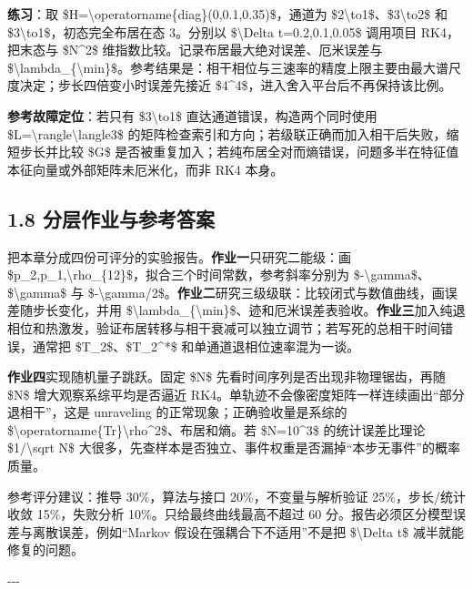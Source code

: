 \documentclass[UTF8,openany,11pt,fontset=fandol]{ctexbook}
\begin{document}
\textbf{练习}：取
\$H=\textbackslash operatorname\{diag\}(0,0.1,0.35)\$，通道为
\$2\textbackslash to1\$、\$3\textbackslash to2\$ 和
\$3\textbackslash to1\$，初态完全布居在态 3。分别以
\$\textbackslash Delta t=0.2,0.1,0.05\$ 调用项目 RK4，把末态与
\$N\^{}2\$ 维指数比较。记录布居最大绝对误差、厄米误差与
\$\textbackslash lambda\_\{\textbackslash min\}\$。参考结果是：相干相位与三速率的精度上限主要由最大谱尺度决定；步长四倍变小时误差先接近
\$4\^{}4\$，进入舍入平台后不再保持该比例。

\textbf{参考故障定位}：若只有 \$3\textbackslash to1\$
直达通道错误，构造两个同时使用
\$L=\textbackslash rangle\textbackslash langle3\textbar\$
的矩阵检查索引和方向；若级联正确而加入相干后失败，缩短步长并比较 \$G\$
是否被重复加入；若纯布居全对而熵错误，问题多半在特征值本征向量或外部矩阵未厄米化，而非
RK4 本身。

\subsection{\texorpdfstring{\textbf{1.8
分层作业与参考答案}}{1.8 分层作业与参考答案}}\label{ux5206ux5c42ux4f5cux4e1aux4e0eux53c2ux8003ux7b54ux6848}

把本章分成四份可评分的实验报告。\textbf{作业一}只研究二能级：画
\$p\_2,p\_1,\textbar\textbackslash rho\_\{12\}\textbar\$，拟合三个时间常数，参考斜率分别为
\$-\textbackslash gamma\$、\$\textbackslash gamma\$ 与
\$-\textbackslash gamma/2\$。\textbf{作业二}研究三级级联：比较闭式与数值曲线，画误差随步长变化，并用
\$\textbackslash lambda\_\{\textbackslash min\}\$、迹和厄米误差表验收。\textbf{作业三}加入纯退相位和热激发，验证布居转移与相干衰减可以独立调节；若写死的总相干时间错误，通常把
\$T\_2\$、\$T\_2\^{}*\$ 和单通道退相位速率混为一谈。

\textbf{作业四}实现随机量子跳跃。固定 \$N\$
先看时间序列是否出现非物理锯齿，再随 \$N\$ 增大观察系综平均是否逼近
RK4。单轨迹不会像密度矩阵一样连续画出``部分退相干''，这是 unraveling
的正常现象；正确验收量是系综的
\$\textbackslash operatorname\{Tr\}\textbackslash rho\^{}2\$、布居和熵。若
\$N=10\^{}3\$ 的统计误差比理论 \$1/\textbackslash sqrt N\$
大很多，先查样本是否独立、事件权重是否漏掉``本步无事件''的概率质量。

参考评分建议：推导 30\%，算法与接口 20\%，不变量与解析验证
25\%，步长/统计收敛 15\%，失败分析 10\%。只给最终曲线最高不超过 60
分。报告必须区分模型误差与离散误差，例如``Markov
假设在强耦合下不适用''不是把 \$\textbackslash Delta t\$
减半就能修复的问题。

-\/-\/-
\end{document}
